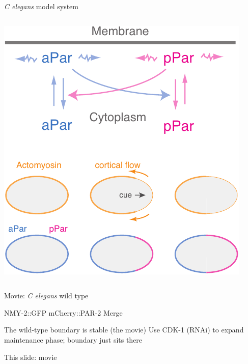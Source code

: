 \documentclass{beamer}
\newcommand{\6}[1]{#1_{\text{6}}}
\newcommand{\3}[1]{#1_{\text{3}}}
\begin{document}
\begin{frame}{\emph{C elegans} model system}
\begin{columns}
\begin{column}{0.5\textwidth}
\includegraphics[width=\textwidth]{CElegansScheme-crop.pdf}
\end{column}
\end{columns}
\end{frame}

\begin{frame}{Movie: \emph{C elegans} wild type}
\begin{center}
\hspace{-0.75 cm} NMY-2::GFP  \phantom{O thou}  mCherry::PAR-2 \phantom{O thouth} Merge
\end{center}
\end{frame}

\begin{frame}{The wild-type boundary is stable (the movie)}
Use CDK-1 (RNAi) to expand maintenance phase; boundary just sits there

This slide: movie

\end{frame}
\end{document}
